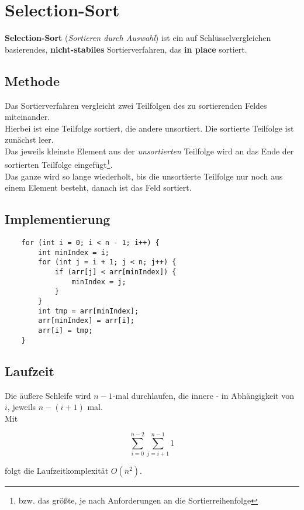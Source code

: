 \section{Selection-Sort}

\textbf{Selection-Sort} (\textit{Sortieren durch Auswahl}) ist ein auf Schlüsselvergleichen basierendes, \textbf{nicht-stabiles} Sortierverfahren, das \textbf{in place} sortiert.

\subsection{Methode}
Das Sortierverfahren vergleicht zwei Teilfolgen des zu sortierenden Feldes miteinander.\\
Hierbei ist eine Teilfolge sortiert, die andere unsortiert.
Die sortierte Teilfolge ist zunächst leer.\\
Das jeweils kleinste Element aus der \textit{unsortierten} Teilfolge wird an das Ende der sortierten Teilfolge eingefügt\footnote{bzw. das größte, je nach Anforderungen an die Sortierreihenfolge}.\\
Das ganze wird so lange wiederholt, bis die unsortierte Teilfolge nur noch aus einem Element besteht, danach ist das Feld sortiert.


\subsection{Implementierung}

\begin{verbatim}
    for (int i = 0; i < n - 1; i++) {
        int minIndex = i;
        for (int j = i + 1; j < n; j++) {
            if (arr[j] < arr[minIndex]) {
                minIndex = j;
            }
        }
        int tmp = arr[minIndex];
        arr[minIndex] = arr[i];
        arr[i] = tmp;
    }
\end{verbatim}


\subsection{Laufzeit}
Die äußere Schleife wird $n - 1$-mal durchlaufen, die innere - in Abhängigkeit von $i$, jeweils $n - (i + 1)$ mal.\\
Mit

\begin{equation}
    \sum_{i=0}^{n-2} \sum_{j = i + 1}^{n - 1} 1
\end{equation}

\noindent
folgt die Laufzeitkomplexität $O(n^2)$.\\

